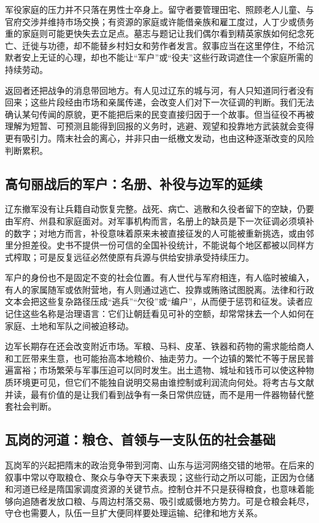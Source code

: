 军役家庭的压力并不只落在男性士卒身上。留守者要管理田宅、照顾老人儿童、与官府交涉并维持市场交换；有资源的家庭或许能借亲族和雇工度过，人丁少或债务重的家庭则可能更快失去立足点。墓志与题记让我们偶尔看到精英家族如何纪念死亡、迁徙与功德，却不能替乡村妇女和劳作者发言。叙事应当在这里停住，不给沉默者安上无证的心理，却也不能让“军户”或“役夫”这些行政词遮住一个家庭所需的持续劳动。

返回者还把战争的消息带回地方。有人见过辽东的城与河，有人只知道同行者没有回来；这些片段经由市场和亲属传递，会改变人们对下一次征调的判断。我们无法确认某句传闻的原貌，更不能把后来的民变直接归因于一个故事。但当征役不再被理解为短暂、可预测且能得到回报的义务时，逃避、观望和投靠地方武装就会变得更有吸引力。隋末社会的离心，并非只由一纸檄文发动，也由这种逐渐改变的风险判断累积。

\subsection{高句丽战后的军户：名册、补役与边军的延续}
辽东撤军没有让兵籍自动恢复完整。战死、病亡、逃散和久役者留下的空缺，仍要由军府、州县和家庭面对。对军事机构而言，名册上的缺员是下一次征调必须填补的数字；对地方而言，补役意味着原来未被直接征发的人可能被重新挑选，或由邻里分担差役。史书不提供一份可信的全国补役统计，不能说每个地区都被以同样方式榨取；可是反复远征必然使原有兵源与供给安排承受持续压力。

军户的身份也不是固定不变的社会位置。有人世代与军府相连，有人临时被编入，有人的家属随军或依附营地，有人则通过逃亡、投靠或贿赂试图脱离。法律和行政文本会把这些复杂路径压成“逃兵”“欠役”或“编户”，从而便于惩罚和征发。读者应记住这些名称是治理语言：它们让朝廷看见可补的空额，却常常抹去一个人如何在家庭、土地和军队之间被迫移动。

边军长期存在还会改变附近市场。军粮、马料、皮革、铁器和药物的需求能给商人和工匠带来生意，也可能抬高本地粮价、抽走劳力。一个边镇的繁忙不等于居民普遍富裕；市场繁荣与军事压迫可以同时发生。出土遗物、城址和钱币可以使这种物质环境更可见，但它们不能独自说明交易由谁控制或利润流向何处。将考古与文献并读，最有价值的是让我们看到战争有一条日常供应链，而不是用一件器物替代整套社会判断。

\subsection{瓦岗的河道：粮仓、首领与一支队伍的社会基础}
瓦岗军的兴起把隋末的政治竞争带到河南、山东与运河网络交错的地带。在后来的叙事中常以夺取粮仓、聚众与争夺天下来表现；这些行动之所以可能，正因为仓储和河道已经是隋国家调度资源的关键节点。控制仓并不只是获得粮食，也意味着能够向追随者发放口粮、与周边村落交易、吸引或威慑地方势力。可是仓粮会耗尽，守仓也需要人，队伍一旦扩大便同样要处理运输、纪律和地方关系。

